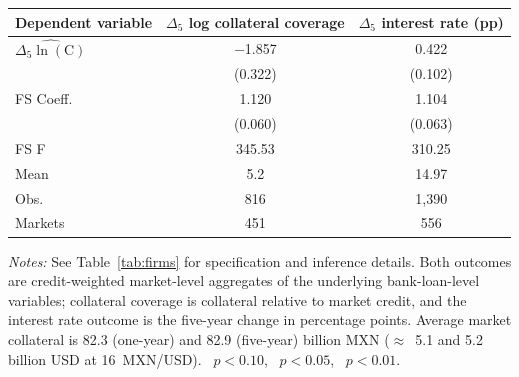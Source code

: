 \centering
\label{tab:collateral_rate}
\begin{threeparttable}
\begin{tabular}{lcc}
\toprule
\textbf{Dependent variable} & $\Delta_5$ log collateral coverage & $\Delta_5$ interest rate (pp) \\
\midrule
$\widehat{\Delta_5\ln(\text{C})}$
& $-$1.857\sym{***} & 0.422\sym{***} \\
& (0.322) & (0.102) \\
\midrule
FS Coeff. & 1.120 & 1.104 \\
          & (0.060) & (0.063) \\
FS F & 345.53 & 310.25 \\
Mean  & 5.2   & 14.97 \\ %
Obs.  & 816 & 1{,}390 \\
Markets & 451 & 556 \\
\bottomrule
\end{tabular}
\begin{tablenotes}[flushleft]
\footnotesize
\item \textit{Notes:} See Table~\ref{tab:firms} for specification and inference details. Both outcomes are credit-weighted market-level aggregates of the underlying bank-loan-level variables; collateral coverage is collateral relative to market credit, and the interest rate outcome is the five-year change in percentage points. Average market collateral is 82.3 (one-year) and 82.9 (five-year) billion MXN ($\approx$~5.1 and 5.2 billion USD at 16~MXN/USD). \sym{*}~$p<0.10$, \sym{**}~$p<0.05$, \sym{***}~$p<0.01$. %
\end{tablenotes}
\end{threeparttable}